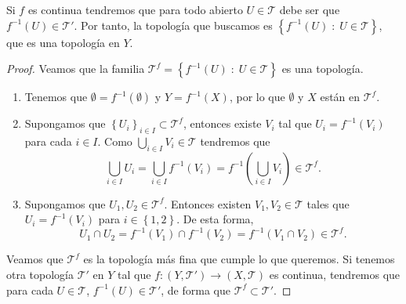 \begin{observation}
Si $\displaystyle f $ es continua tendremos que para todo abierto $\displaystyle U \in \mathcal{T} $ debe ser que $\displaystyle f^{-1}\left(U\right)\in \mathcal{T}' $. Por tanto, la topología que buscamos es $\displaystyle \left\{ f^{-1}\left(U\right) \; : \; U \in \mathcal{T}\right\}  $, que es una topología en $\displaystyle Y $.
\end{observation}
\begin{proof}
	Veamos que la familia $\displaystyle \mathcal{T}^{f}=\left\{ f^{-1}\left(U\right) \; : \; U \in \mathcal{T}\right\}  $ es una topología. 
	\begin{enumerate}
	\item Tenemos que $\displaystyle \emptyset = f^{-1}\left(\emptyset \right) $ y $\displaystyle Y = f^{-1}\left(X\right) $, por lo que $\displaystyle \emptyset  $ y $\displaystyle X $ están en $\displaystyle \mathcal{T}^{f} $.  
	\item Supongamos que $\displaystyle \left\{ U_{i}\right\} _{i \in I}\subset \mathcal{T}^{f}$, entonces existe $\displaystyle V_{i} $ tal que $\displaystyle U_{i} = f^{-1}\left(V_{i}\right) $ para cada $\displaystyle i \in I $. Como $\displaystyle \bigcup_{i \in I}V_{i} \in \mathcal{T} $ tendremos que  
		\[\bigcup_{i \in I}U_{i}=\bigcup_{i \in I}f^{-1}\left(V_{i}\right)=f^{-1}\left(\bigcup_{i \in I}V_{i}\right) \in \mathcal{T}^{f} .\]
	\item Supongamos que $\displaystyle U_{1}, U_{2} \in \mathcal{T}^{f} $. Entonces existen $\displaystyle V_{1}, V_{2} \in \mathcal{T} $ tales que $\displaystyle U_{i} = f^{-1}\left(V_{i}\right) $ para $\displaystyle i \in \left\{ 1,2\right\}  $. De esta forma, 
		\[U_{1} \cap U_{2}=f^{-1}\left(V_{1}\right)\cap f^{-1}\left(V_{2}\right)=f^{-1}\left(V_{1} \cap V_{2}\right)\in \mathcal{T}^{f} .\]
	\end{enumerate}
	Veamos que $\displaystyle \mathcal{T}^{f} $ es la topología más fina que cumple lo que queremos. Si tenemos otra topología $\displaystyle \mathcal{T}' $ en $\displaystyle Y $ tal que $\displaystyle f : \left(Y, \mathcal{T}'\right)\to \left(X, \mathcal{T}\right) $ es continua, tendremos que para cada $\displaystyle U \in \mathcal{T} $, $\displaystyle f^{-1}\left(U\right)\in \mathcal{T}' $, de forma que $\displaystyle \mathcal{T}^{f}\subset \mathcal{T}' $. 
\end{proof}

